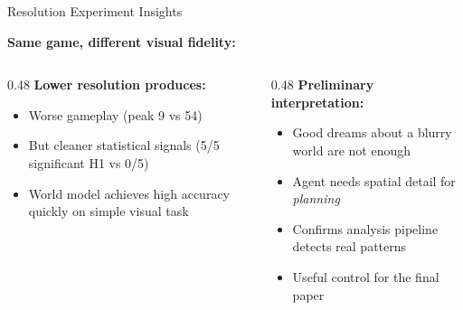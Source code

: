 \documentclass[aspectratio=169]{beamer}
\begin{document}
\begin{frame}{Resolution Experiment Insights}

\textbf{Same game, different visual fidelity:}

\vspace{0.5em}
\begin{columns}
\begin{column}{0.48\textwidth}
\textbf{Lower resolution produces:}
\begin{itemize}
    \item Worse gameplay (peak 9 vs 54)
    \item But cleaner statistical signals (5/5 significant H1 vs 0/5)
    \item World model achieves high accuracy quickly on simple visual task
\end{itemize}
\end{column}
\begin{column}{0.48\textwidth}
\textbf{Preliminary interpretation:}
\begin{itemize}
    \item Good dreams about a blurry world are not enough
    \item Agent needs spatial detail for \textit{planning}
    \item Confirms analysis pipeline detects real patterns
    \item Useful control for the final paper
\end{itemize}
\end{column}
\end{columns}
\end{frame}
\end{document}
